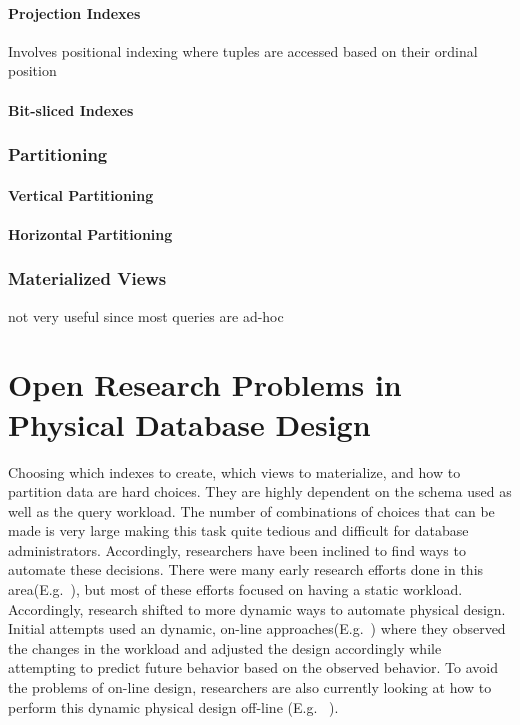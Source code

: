 \documentclass[12pt,a4paper]{article}
\begin{document}
\paragraph{Projection Indexes}
Involves positional indexing where tuples are accessed based on their ordinal position \cite{628286}

\paragraph{Bit-sliced Indexes}


\subsubsection{Partitioning}
\cite{thusoo2010data}
\paragraph{Vertical Partitioning}

\paragraph{Horizontal Partitioning}

\subsubsection{Materialized Views}
not very useful since most queries are ad-hoc \cite{653447}
\cite{355309}


\section{Open Research Problems in Physical Database Design}
\label{SEC-OPEN}

Choosing which indexes to create, which views to materialize, and how to partition data are hard choices. They are highly dependent on the schema used as well
as the query workload. The number of combinations of choices that can be made is very large making this task quite tedious and difficult for database
administrators. Accordingly, researchers have been inclined to find ways to automate these decisions. There were many early research efforts done in this
area(E.g.~\cite{finkelstein1988physical, hammer76selec, frank1992selec, chaudhuri1997overview, schiefer1999db2, valentin2000select}), but most of these efforts
focused on having a static workload. Accordingly, research shifted to more dynamic ways to automate physical design. Initial attempts used an dynamic, on-line
approaches(E.g.~\cite{bruno2007online, sattler2003, schnaitter2007}) where they observed the changes in the workload and adjusted the design accordingly while
attempting to predict future behavior based on the observed behavior. To avoid the problems of on-line design, researchers are also currently looking at how to
perform this dynamic physical design off-line (E.g. ~\cite{hannes2008,agrawal2006}).
\end{document}
